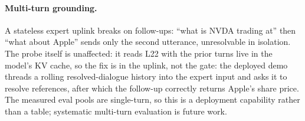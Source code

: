 \paragraph{Multi-turn grounding.} A stateless expert uplink breaks on
follow-ups: ``what is NVDA trading at'' then ``what about Apple'' sends
only the second utterance, unresolvable in isolation. The probe itself
is unaffected: it reads L22 with the prior turns live in the
model's KV cache, so the fix is in the uplink, not the gate: the
deployed demo threads a rolling resolved-dialogue history into the
expert input and asks it to resolve references, after which the
follow-up correctly returns Apple's share price. The measured eval
pools are single-turn, so this is a deployment capability rather than
a table; systematic multi-turn evaluation is future work.


